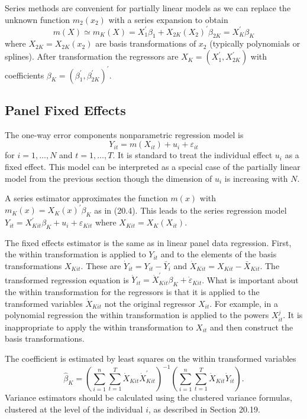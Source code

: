 \documentclass[10pt]{article}
\begin{document}
Series methods are convenient for partially linear models as we can replace the unknown function $m_{2}\left(x_{2}\right)$ with a series expansion to obtain
$$
m(X) \simeq m_{K}(X)=X_{1}^{\prime} \beta_{1}+X_{2 K}\left(X_{2}\right)^{\prime} \beta_{2 K}=X_{K}^{\prime} \beta_{K}
$$
where $X_{2 K}=X_{2 K}\left(x_{2}\right)$ are basis transformations of $x_{2}$ (typically polynomials or splines). After transformation the regressors are $X_{K}=\left(X_{1}^{\prime}, X_{2 K}^{\prime}\right)$ with coefficients $\beta_{K}=\left(\beta_{1}^{\prime}, \beta_{2 K}^{\prime}\right)^{\prime}$.

\subsection{Panel Fixed Effects}
The one-way error components nonparametric regression model is
$$
Y_{i t}=m\left(X_{i t}\right)+u_{i}+\varepsilon_{i t}
$$
for $i=1, \ldots, N$ and $t=1, \ldots, T$. It is standard to treat the individual effect $u_{i}$ as a fixed effect. This model can be interpreted as a special case of the partially linear model from the previous section though the dimension of $u_{i}$ is increasing with $N$.

A series estimator approximates the function $m(x)$ with $m_{K}(x)=X_{K}(x)^{\prime} \beta_{K}$ as in (20.4). This leads to the series regression model $Y_{i t}=X_{K i t}^{\prime} \beta_{K}+u_{i}+\varepsilon_{K i t}$ where $X_{K i t}=X_{K}\left(X_{i t}\right)$.

The fixed effects estimator is the same as in linear panel data regression. First, the within transformation is applied to $Y_{i t}$ and to the elements of the basis transformations $X_{K i t}$. These are $\dot{Y}_{i t}=Y_{i t}-\bar{Y}_{i}$ and $\dot{X}_{K i t}=X_{K i t}-\bar{X}_{K i t}$. The transformed regression equation is $\dot{Y}_{i t}=\dot{X}_{K i t}^{\prime} \beta_{K}+\dot{\varepsilon}_{K i t}$. What is important about the within transformation for the regressors is that it is applied to the transformed variables $\dot{X}_{K i t}$ not the original regressor $X_{i t}$. For example, in a polynomial regression the within transformation is applied to the powers $X_{i t}^{j}$. It is inappropriate to apply the within transformation to $X_{i t}$ and then construct the basis transformations.

The coefficient is estimated by least squares on the within transformed variables
$$
\widehat{\beta}_{K}=\left(\sum_{i=1}^{n} \sum_{t=1}^{T} \dot{X}_{K i t} \dot{X}_{K i t}^{\prime}\right)^{-1}\left(\sum_{i=1}^{n} \sum_{t=1}^{T} \dot{X}_{K i t} \dot{Y}_{i t}\right) .
$$
Variance estimators should be calculated using the clustered variance formulas, clustered at the level of the individual $i$, as described in Section 20.19.
\end{document}
